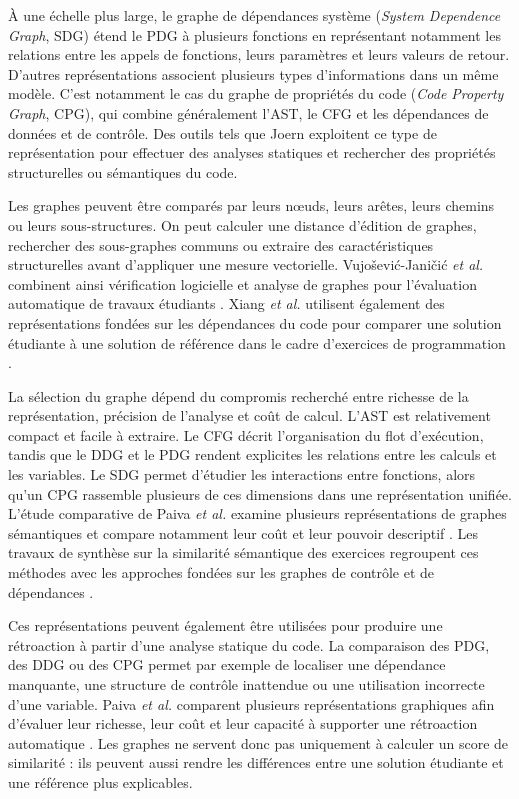 \documentclass[12pt,a4paper,oneside]{report}
\begin{document}
À une échelle plus large, le graphe de dépendances système
(\emph{System Dependence Graph}, SDG) étend le PDG à plusieurs fonctions en
représentant notamment les relations entre les appels de fonctions, leurs
paramètres et leurs valeurs de retour. D'autres représentations associent
plusieurs types d'informations dans un même modèle. C'est notamment le cas
du graphe de propriétés du code (\emph{Code Property Graph}, CPG), qui
combine généralement l'AST, le CFG et les dépendances de données et de
contrôle. Des outils tels que Joern exploitent ce type de représentation
pour effectuer des analyses statiques et rechercher des propriétés
structurelles ou sémantiques du code.

Les graphes peuvent être comparés par leurs nœuds, leurs arêtes, leurs
chemins ou leurs sous-structures. On peut calculer une distance d'édition de
graphes, rechercher des sous-graphes communs ou extraire des caractéristiques
structurelles avant d'appliquer une mesure vectorielle. Vujošević-Janičić
\emph{et al.} combinent ainsi vérification logicielle et analyse de graphes
pour l'évaluation automatique de travaux étudiants
\cite{vujosevic-janicic_software_2013}. Xiang \emph{et al.} utilisent
également des représentations fondées sur les dépendances du code pour
comparer une solution étudiante à une solution de référence dans le cadre
d'exercices de programmation \cite{xiang_graph_2024}.

La sélection du graphe dépend du compromis recherché entre richesse de la
représentation, précision de l'analyse et coût de calcul. L'AST est
relativement compact et facile à extraire. Le CFG décrit l'organisation du
flot d'exécution, tandis que le DDG et le PDG rendent explicites les
relations entre les calculs et les variables. Le SDG permet d'étudier les
interactions entre fonctions, alors qu'un CPG rassemble plusieurs de ces
dimensions dans une représentation unifiée. L'étude comparative de Paiva
\emph{et al.} examine plusieurs représentations de graphes sémantiques et
compare notamment leur coût et leur pouvoir descriptif
\cite{paiva_comparing_2024}. Les travaux de synthèse sur la similarité
sémantique des exercices regroupent ces méthodes avec les approches fondées
sur les graphes de contrôle et de dépendances
\cite{reddy_graph-based_2025}.

Ces représentations peuvent également être utilisées pour produire une
rétroaction à partir d'une analyse statique du code. La comparaison des PDG,
des DDG ou des CPG permet par exemple de localiser une dépendance manquante,
une structure de contrôle inattendue ou une utilisation incorrecte d'une
variable. Paiva \emph{et al.} comparent plusieurs représentations
graphiques afin d'évaluer leur richesse, leur coût et leur capacité à
supporter une rétroaction automatique \cite{paiva_comparing_2024}. Les
graphes ne servent donc pas uniquement à calculer un score de similarité :
ils peuvent aussi rendre les différences entre une solution étudiante et une
référence plus explicables.
\end{document}
